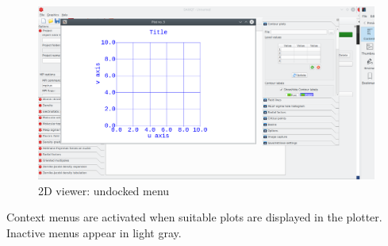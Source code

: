 \documentclass[10pt]{article}
\begin{document}
\begin{figure}[H]
    \begin{center}
        \includegraphics[width=.5\linewidth]{damqt320_2D_viewer_undock.png}
    \end{center}
    \caption{2D viewer: undocked menu \label{fig:3_2}}
\end{figure}

\vspace*{5mm}

Context menus are activated when suitable plots are displayed in the plotter. Inactive menus appear in light gray.   
\end{document}
